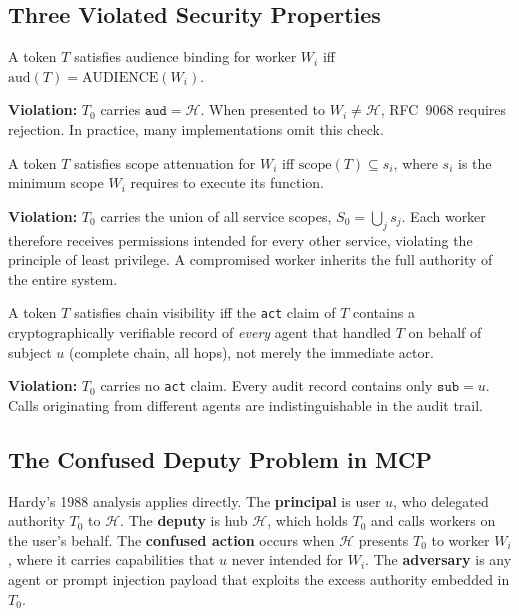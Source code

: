 \documentclass[journal]{IEEEtran}
\begin{document}
\subsection{Three Violated Security Properties}

\begin{definition}
A token $T$ satisfies audience binding for worker $W_i$ iff
$\mathrm{aud}(T) = \mathrm{AUDIENCE}(W_i)$.
\end{definition}

\textbf{Violation:} $T_0$ carries $\texttt{aud} = \mathcal{H}$. When presented
to $W_i \neq \mathcal{H}$, RFC~9068 requires rejection. In practice, many
implementations omit this check.

\begin{definition}
A token $T$ satisfies scope attenuation for $W_i$ iff
$\mathrm{scope}(T) \subseteq s_i$, where $s_i$ is the minimum scope $W_i$
requires to execute its function.
\end{definition}

\textbf{Violation:} $T_0$ carries the union of all service scopes,
$S_0 = \bigcup_j s_j$. Each worker therefore receives permissions intended
for every other service, violating the principle of least privilege. A
compromised worker inherits the full authority of the entire system.

\begin{definition}
A token $T$ satisfies chain visibility iff the \texttt{act} claim of $T$
contains a cryptographically verifiable record of \emph{every} agent that
handled $T$ on behalf of subject $u$ (complete chain, all hops), not merely
the immediate actor.
\end{definition}

\textbf{Violation:} $T_0$ carries no \texttt{act} claim. Every audit record
contains only $\texttt{sub} = u$. Calls originating from different agents are
indistinguishable in the audit trail.

\subsection{The Confused Deputy Problem in MCP}

Hardy's 1988 analysis \cite{hardy1988} applies directly. The \textbf{principal}
is user $u$, who delegated authority $T_0$ to $\mathcal{H}$. The \textbf{deputy}
is hub $\mathcal{H}$, which holds $T_0$ and calls workers on the user's behalf.
The \textbf{confused action} occurs when $\mathcal{H}$ presents $T_0$ to
worker $W_i$, where it carries capabilities that $u$ never intended for $W_i$.
The \textbf{adversary} is any agent or prompt injection payload that exploits
the excess authority embedded in $T_0$.
\end{document}
